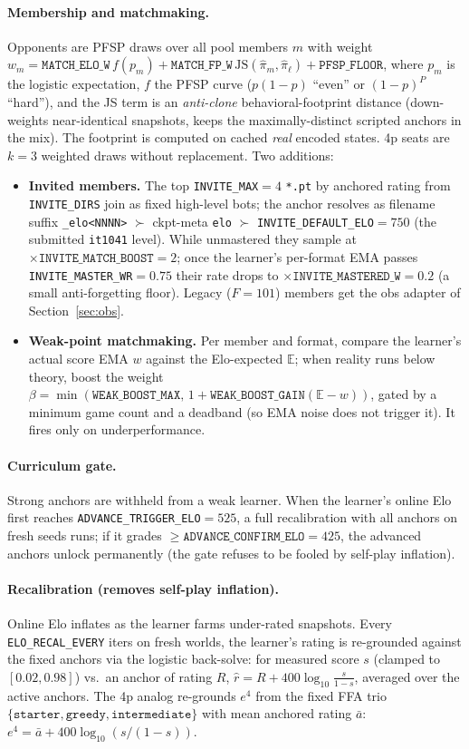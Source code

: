 \documentclass[11pt]{article}
\newcommand{\E}{\mathbb{E}}
\newcommand{\cd}[1]{\texttt{#1}}
\begin{document}
\paragraph{Membership and matchmaking.} Opponents are PFSP draws over all pool members $m$ with weight
$w_m=\cd{MATCH\_ELO\_W}\,f(p_m)+\cd{MATCH\_FP\_W}\,\mathrm{JS}(\hat\pi_m,\hat\pi_\ell)+\cd{PFSP\_FLOOR}$,
where $p_m$ is the logistic expectation, $f$ the PFSP curve ($p(1{-}p)$ ``even'' or $(1{-}p)^P$ ``hard''),
and the JS term is an \emph{anti-clone} behavioral-footprint distance (down-weights near-identical
snapshots, keeps the maximally-distinct scripted anchors in the mix). The footprint is computed on
cached \emph{real} encoded states. 4p seats are $k{=}3$ weighted draws without replacement. Two additions:
\begin{itemize}[nosep,leftmargin=1.6em]
\item \textbf{Invited members.} The top \cd{INVITE\_MAX}$=4$ \cd{*.pt} by anchored rating from
  \cd{INVITE\_DIRS} join as fixed high-level bots; the anchor resolves as filename suffix
  \cd{\_elo<NNNN>} $\succ$ ckpt-meta \cd{elo} $\succ$ \cd{INVITE\_DEFAULT\_ELO}$=750$ (the submitted
  \cd{it1041} level). While unmastered they sample at $\times\cd{INVITE\_MATCH\_BOOST}{=}2$; once the
  learner's per-format EMA passes \cd{INVITE\_MASTER\_WR}$=0.75$ their rate drops to
  $\times\cd{INVITE\_MASTERED\_W}{=}0.2$ (a small anti-forgetting floor). Legacy ($F{=}101$) members get
  the obs adapter of Section~\ref{sec:obs}.
\item \textbf{Weak-point matchmaking.} Per member and format, compare the learner's actual score EMA $w$
  against the Elo-expected $\E$; when reality runs below theory, boost the weight
  $\beta=\min(\cd{WEAK\_BOOST\_MAX},\,1+\cd{WEAK\_BOOST\_GAIN}(\E-w))$, gated by a minimum game count and a
  deadband (so EMA noise does not trigger it). It fires only on underperformance.
\end{itemize}

\paragraph{Curriculum gate.} Strong anchors are withheld from a weak learner. When the learner's online
Elo first reaches \cd{ADVANCE\_TRIGGER\_ELO}$=525$, a full recalibration with all anchors on fresh seeds
runs; if it grades $\ge\cd{ADVANCE\_CONFIRM\_ELO}=425$, the advanced anchors unlock permanently
(the gate refuses to be fooled by self-play inflation).

\paragraph{Recalibration (removes self-play inflation).} Online Elo inflates as the learner farms
under-rated snapshots. Every \cd{ELO\_RECAL\_EVERY} iters on fresh worlds, the learner's rating is
re-grounded against the fixed anchors via the logistic back-solve: for measured score $s$ (clamped to
$[0.02,0.98]$) vs.\ an anchor of rating $R$, $\hat r=R+400\log_{10}\frac{s}{1-s}$, averaged over the
active anchors. The 4p analog re-grounds $e^4$ from the fixed FFA trio
$\{\cd{starter},\cd{greedy},\cd{intermediate}\}$ with mean anchored rating $\bar a$:
$e^4=\bar a+400\log_{10}(s/(1{-}s))$.
\end{document}
